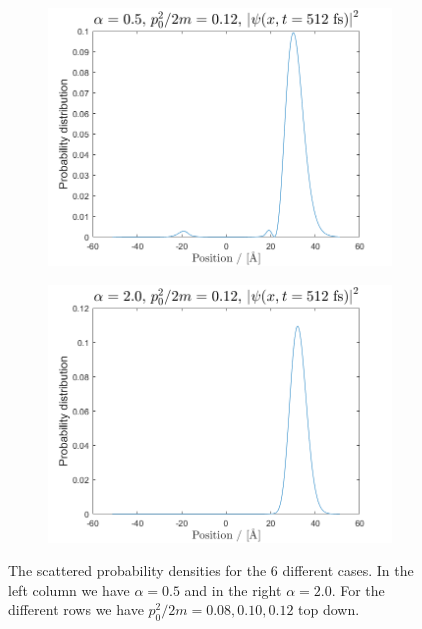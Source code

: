 \begin{figure}[H]
\begin{subfigure}[t]{0.47\textwidth}
	\includegraphics[width=\textwidth]{graphics/task3/a1e3.png}
	\caption{}
	\label{fig:3_e}
\end{subfigure}
\begin{subfigure}[t]{0.47\textwidth}
	\includegraphics[width=\textwidth]{graphics/task3/a2e3.png}
	\caption{}
	\label{fig:3_f}
\end{subfigure}

\caption{The scattered probability densities for the 6 different cases. In the left column we have $\alpha = 0.5$ and in the right $\alpha=2.0$. For the different rows we have $p_0^2/2m=0.08, 0.10, 0.12$ top down. }
\label{fig:3}
\end{figure}

